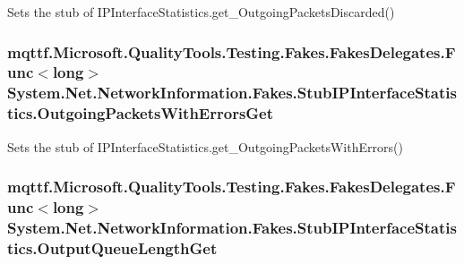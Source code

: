 Sets the stub of I\-P\-Interface\-Statistics.\-get\-\_\-\-Outgoing\-Packets\-Discarded()

\hypertarget{class_system_1_1_net_1_1_network_information_1_1_fakes_1_1_stub_i_p_interface_statistics_a0da4fab99c659892b028904e9bf4bcb6}{
\subsubsection[{Outgoing\-Packets\-With\-Errors\-Get}]{\setlength{\rightskip}{0pt plus 5cm}mqttf.\-Microsoft.\-Quality\-Tools.\-Testing.\-Fakes.\-Fakes\-Delegates.\-Func$<$long$>$ System.\-Net.\-Network\-Information.\-Fakes.\-Stub\-I\-P\-Interface\-Statistics.\-Outgoing\-Packets\-With\-Errors\-Get}}\label{class_system_1_1_net_1_1_network_information_1_1_fakes_1_1_stub_i_p_interface_statistics_a0da4fab99c659892b028904e9bf4bcb6}


Sets the stub of I\-P\-Interface\-Statistics.\-get\-\_\-\-Outgoing\-Packets\-With\-Errors()

\hypertarget{class_system_1_1_net_1_1_network_information_1_1_fakes_1_1_stub_i_p_interface_statistics_a610393a3c6d5f4b1b70aa50c473fc0f8}{
\subsubsection[{Output\-Queue\-Length\-Get}]{\setlength{\rightskip}{0pt plus 5cm}mqttf.\-Microsoft.\-Quality\-Tools.\-Testing.\-Fakes.\-Fakes\-Delegates.\-Func$<$long$>$ System.\-Net.\-Network\-Information.\-Fakes.\-Stub\-I\-P\-Interface\-Statistics.\-Output\-Queue\-Length\-Get}}\label{class_system_1_1_net_1_1_network_information_1_1_fakes_1_1_stub_i_p_interface_statistics_a610393a3c6d5f4b1b70aa50c473fc0f8}



